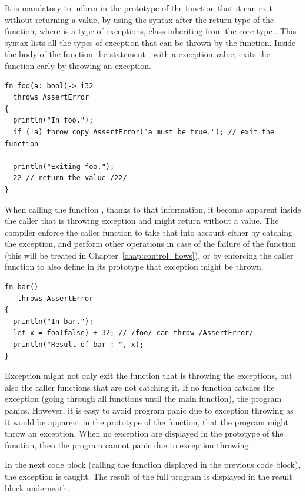 It is mandatory to inform in the prototype of the function that it can exit
without returning a value, by using the syntax  after
the return type of the function, where  is a type of exceptions, class
inheriting from the core type . This syntax
lists all the types of exception that can be thrown by the function. Inside the
body of the function the statement , with  a
exception value, exits the function early by throwing an exception.

\begin{lstlisting}[style=coloredverbatim]
fn foo(a: bool)-> i32
  throws AssertError
{
  println("In foo.");
  if (!a) throw copy AssertError("a must be true."); // exit the function

  println("Exiting foo.");
  22 // return the value /22/
}
\end{lstlisting}

When calling the function , thanks to that information, it become
apparent inside the caller that  is throwing exception and might
return without a value. The compiler enforce the caller function to take that
into account either by catching the exception, and perform other operations in
case of the failure of the function  (this will be treated in
Chapter~\ref{chap:control_flows}), or by enforcing the caller function to also
define in its prototype that exception might be thrown.

\begin{lstlisting}[style=coloredverbatim]
fn bar()
   throws AssertError
{
  println("In bar.");
  let x = foo(false) + 32; // /foo/ can throw /AssertError/
  println("Result of bar : ", x);
}
\end{lstlisting}

Exception might not only exit the function that is throwing the exceptions, but
also the caller functions that are not catching it. If no function catches the
exception (going through all functions until the main function), the program
panics. However, it is easy to avoid program panic due to exception throwing as
it would be apparent in the prototype of the  function, that the
program might throw an exception. When no exception are displayed in the
prototype of the  function, then the program cannot panic due to
exception throwing.

In the next code block (calling the  function displayed in the
previous code block), the exception is caught. The result of the full program is
displayed in the result block underneath.

